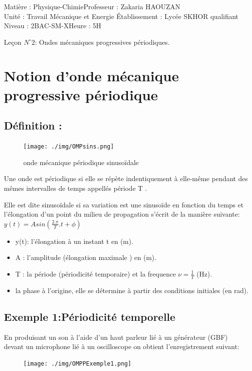 \documentclass[12pt]{article}
\author{Zakaria HAOUZAN}
\date{\today}
\newcommand\headerMe[2]{\noindent{}#1\hfill#2}
\begin{document}
\headerMe{Matière : Physique-Chimie}{Professeur : Zakaria HAOUZAN}\\
\headerMe{Unité : Travail Mécanique et Energie }{Établissement : Lycée SKHOR qualifiant}\\
\headerMe{Niveau : 2BAC-SM-X}{Heure : 5H}\\

\begin{center}

    \Large{Leçon $N^{\circ} 2 $: \color{red}Ondes mécaniques progressives périodiques. }
\end{center}


\section{Notion d’onde mécanique progressive périodique}
\subsection{Définition : }

\begin{figure}
	\vspace{-2cm}
	\texttt{[image: ./img/OMPsins.png]}
	\caption{ onde mécanique périodique sinusoïdale}
\end{figure}

Une onde est périodique si elle se répète indentiquement à elle-même pendant des mêmes intervalles de temps appellés période T .  

Elle est dite sinusoïdale si sa variation est une sinusoïde en fonction du temps et l'élongation d'un point du milieu de propagation
s'écrit de la manière suivante: \\$y(t) = Asin(\frac{2.\pi}{T}.t + \phi)$

\vspace{-0.4cm}
\begin{itemize}
\item y(t): l’élongation à un instant t en (m).
\item A : l'amplitude (élongation maximale ) en (m).
\item T : la période (périodicité temporaire) et la frequence  $\nu = \frac{1}{T}$ (Hz).
\item la phase à l'origine, elle se détermine à partir des conditions initiales (en rad).
\end{itemize}

\subsection{Exemple 1:Périodicité temporelle }
En produisant un son à l'aide d'un haut parleur lié à un générateur (GBF) devant un microphone lié à un oscilloscope on obtient
l'enregistrement suivant:
\begin{figure}[h]
	\begin{center}
		\texttt{[image: ./img/OMPPExemple1.png]}
	\end{center}
\end{figure}
\begin{center}
	\vspace{-2.5cm}
\end{center}
\end{document}
